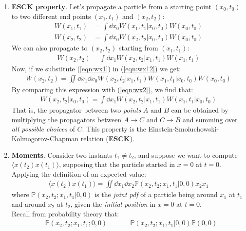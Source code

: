 \documentclass[../template.tex]{subfiles}
\begin{document}
\begin{enumerate}
    \item \textbf{ESCK property}. Let's propagate a particle from a starting point $(x_0, t_0 )$ to two different end points $(x_1 , t_1 )$ and $(x_2 , t_2 )$:
    \begin{align}
        \label{eqn:wx1}
        W(x_1, t_1) &= \int \dd{x_0} W(x_1, t_1|x_0, t_0) W(x_0, t_0) \\
        W(x_2, t_2) &= \int \dd{x_0} W(x_2, t_2|x_0, t_0) W(x_0, t_0) \label{eqn:wx2}
    \end{align}
    We can also propagate to $(x_2, t_2 )$ starting from $(x_1, t_1)$:
    \begin{align}
        W(x_2, t_2) = \int \dd{x_1} W(x_2, t_2 | x_1, t_1) W(x_1, t_1)
        \label{eqn:wx12}
    \end{align}  
    Now, if we substitute (\ref{eqn:wx1}) in (\ref{eqn:wx12}) we get:
    \begin{align*}
        W(x_2, t_2) = \iint \dd{x_1} \dd{x_0} W(x_2, t_2 | x_1, t_1) W(x_1, t_1 | x_0, t_0) W(x_0, t_0)
    \end{align*} 
    By comparing this expression with (\ref{eqn:wx2}), we find that:
    \begin{align*}
        W(x_2, t_2 | x_0, t_0) = \int \dd{x_1} W(x_2, t_2 | x_1, t_1) W(x_1, t_1 | x_0, t_0)
    \end{align*}
    That is, the propagator between two \textit{points} $A$ and $B$ can be obtained by multiplying the propagators between $A \to C$ and $C \to B$ and summing over \textit{all possible choices} of $C$. This property is the Einstein-Smoluchowski-Kolmogorov-Chapman relation (\textbf{ESCK}).
    \item \textbf{Moments}. Consider two instants $t_1 \neq t_2$, and suppose we want to compute $\langle x(t_2) x(t_1) \rangle$, supposing that the particle started in $x=0$ at $t=0$. Applying the definition of an expected value:
    \begin{align*}
        \langle x(t_2) x(t_1) \rangle = \iint \dd{x_1} \dd{x_2} \mathbb{P}(x_2, t_2; x_1, t_1|0,0) x_2 x_1
    \end{align*}
    where $\mathbb{P}(x_2, t_2; x_1,t_1|0,0)$ is the \textit{joint pdf} of a particle being around $x_1 $ at $t_1 $ and around $x_2 $ at $t_2 $, given the \textit{initial position} in $x=0$ at $t=0$.\\
    Recall from probability theory that:
    \begin{align*}
        &\mathbb{P}(x_2, t_2; x_1, t_1;0,0) &=& \quad \mathbb{P}(x_2,t_2;x_1,t_1|0,0) \mathbb{P}(0,0)  \\

\end{align*}
\end{enumerate}
\end{document}
